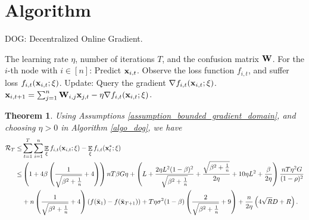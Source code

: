 \documentclass{article}
\newtheorem{Theorem}{\bf{Theorem}}
\begin{document}
\section{Algorithm}


\newcommand\StateX{\Statex\hspace{\algorithmicindent}}
\begin{algorithm}[!]
   \caption{DOG: Decentralized Online Gradient.}
   \label{algo_dog}
   \begin{algorithmic}[1]
   \Require The learning rate $\eta$, number of iterations $T$, and the confusion matrix ${\bf W}$.
           \StateX For the $i$-th node with $i\in[n]$:
            \State \indent Predict ${\bf x}_{i,t}$.
            \State \indent Observe the loss function $f_{i,t}$,
            \StateX \indent and suffer loss $f_{i,t}({\bf x}_{i,t};\xi)$.
            \StateX Update:
            \State \indent Query the gradient $\nabla f_{i,t}({\bf x}_{i,t};\xi)$.  
            \State \indent ${\bf x}_{i,t+1} = \sum_{j=1}^n {\bf W}_{i,j}{\bf x}_{j,t} - \eta \nabla f_{i,t}({\bf x}_{i,t};\xi)$. 
       \EndFor
   \end{algorithmic}
\end{algorithm}










\begin{Theorem}
\label{theorem_regret_upper_bound}
Using Assumptions \ref{assumption_bounded_gradient_domain}, and choosing $\eta>0$ in Algorithm \ref{algo_dog}, we have
\begin{align}
\nonumber
{\mathcal{R}}_T \le &  \sum_{t=1}^T\sum_{i=1}^n \mathop{\mathbb{E}}_{\xi}f_{i,t}({\bf x}_{i,t};\xi) - \mathop{\mathbb{E}}_{\xi}f_{i,t}({\bf x}_t^\ast;\xi) \\ \nonumber
\le & \left( 1 + 4\beta\left( \frac{1}{\sqrt{\beta^2 + \frac{1}{n}}}+4 \right) \right)nT\beta G \eta + \left(  L + \frac{2\eta L^2(1-\beta)^2}{\sqrt{\beta^2 + \frac{1}{n}}} + \frac{\sqrt{\beta^2 + \frac{1}{n}}}{2\eta} + 10\eta L^2  + \frac{\beta}{2\eta}  \right) \frac{nT \eta^2 G}{(1-\rho)^2} \\ \nonumber 
&+ n\left( \frac{1}{\sqrt{\beta^2 + \frac{1}{n}}} + 4 \right)\left( f(\bar{{\bf x}}_1) - f(\bar{{\bf x}}_{T+1}) \right) + T\eta \sigma^2 (1-\beta)\left( \frac{2}{\sqrt{\beta^2 + \frac{1}{n}}}+9 \right)   + \frac{n}{2\eta}\left(  4\sqrt{R}D + R   \right).\end{align}


\end{Theorem}
\end{document}
